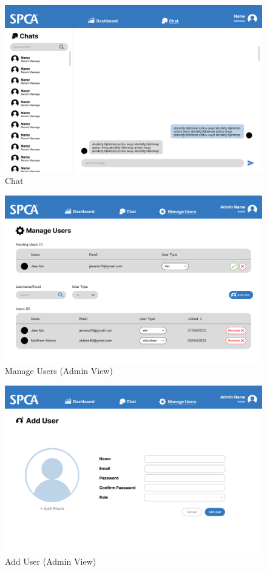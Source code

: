 \begin{figure}[h]
\centering
\includegraphics[width=\textwidth]{proposal/parts/chat.png}
\caption{Chat}
\label{figure: chat}
\end{figure}

\begin{figure}[h]
\centering
\includegraphics[width=\textwidth]{proposal/parts/admin-manage-users.png}
\caption{Manage Users (Admin View)}
\label{figure:manage users}
\end{figure}

\begin{figure}[h]
\centering
\includegraphics[width=\textwidth]{proposal/parts/admin-add-user.png}
\caption{Add User (Admin View)}
\label{figure:add user}
\end{figure}


